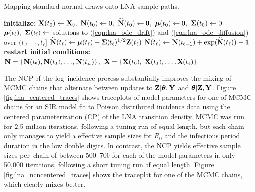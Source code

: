 \begin{algorithm}
	\caption{Mapping standard normal draws onto LNA sample paths.}
	\label{alg:doLNA}
	\begin{algorithmic}[1]
		\State \textbf{initialize: }$ \bX(t_0) \gets \bX_0,\ \bN(t_0) \gets \bs{0},\ \bNtil(t_0) \gets \bs{0},\ \bmu(t_0) \gets \bs{0},\ \bSigma(t_0) \gets \bs{0} $
		\State $ \boldsymbol{\mu}(t_\ell),\ \boldsymbol{\Sigma}(t_\ell) \gets $ solutions to (\ref{eqn:lna_ode_drift}) and (\ref{eqn:lna_ode_diffusion}) over $ (t_{\ell-1}, t_\ell] $
		\State $ \widetilde{\mathbf{N}}(t_\ell)\gets \boldsymbol{\mu}(t_\ell) + \boldsymbol{\Sigma}(t_\ell)^{1/2}\mathbf{Z}(t_\ell) $ 
		\State $ \mathbf{N}(t_\ell)\gets \mathbf{N}(t_{\ell-1}) + \exp(\widetilde{\mathbf{N}}(t_\ell)) - \boldsymbol{1} $
		\State \textbf{restart initial conditions:} 
		\EndFor
		\State \hspace{-0.25in}\Return {}
		\State$\mathbf{N} = \left \lbrace\mathbf{N}(t_0),\mathbf{N}(t_1),\dots,\mathbf{N}(t_L)\right \rbrace,\ \mathbf{X} = \left \lbrace \mathbf{X}(t_0),\ \mathbf{X}(t_1),\dots,\mathbf{X}(t_\ell) \right \rbrace $
		\EndProcedure
	\end{algorithmic}
\end{algorithm}

The NCP of the log--incidence process substantially improves the mixing of MCMC chains that alternate between updates to $ \mathbf{Z}|\boldsymbol{\theta},\mathbf{Y} $ and $ \boldsymbol{\theta}|\mathbf{Z},\mathbf{Y} $. Figure \ref{fig:lna_centered_traces} shows traceplots of model parameters for one of MCMC chains for an SIR model fit to Poisson distributed incidence data using the centered parameterization (CP) of the LNA transition density. MCMC was run for 2.5 million iterations, following a tuning run of equal length, but each chain only manages to yield a effective sample sizes for $ R_0 $ and the infectious period duration in the low double digits. In contrast, the NCP yields effective sample sizes per--chain of between 500--700 for each of the model parameters in only 50,000 iterations, following a short tuning run of equal length. Figure \ref{fig:lna_noncentered_traces} shows the traceplot for one of the MCMC chains, which clearly mixes better. 

